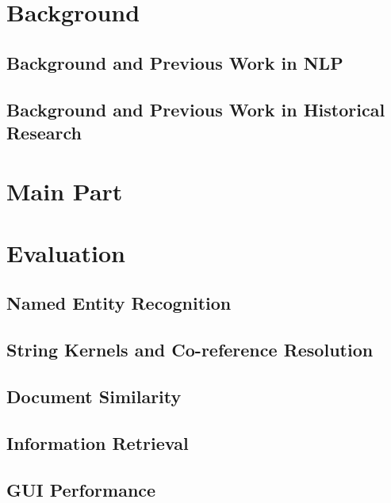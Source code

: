 \documentclass[12pt]{article}
\begin{document}

\section{Background} %
\label{sec:background}


\subsection {Background and Previous Work in NLP}
\subsection {Background and Previous Work in Historical Research}


\section{Main Part} %
\label{sec:main_part}



\section{Evaluation} %
\label{sec:evaluation}

	\subsection {Named Entity Recognition}
	\subsection {String Kernels and Co-reference Resolution}
	\subsection {Document Similarity}
	\subsection {Information Retrieval}
	\subsection {GUI Performance}
\end{document}
